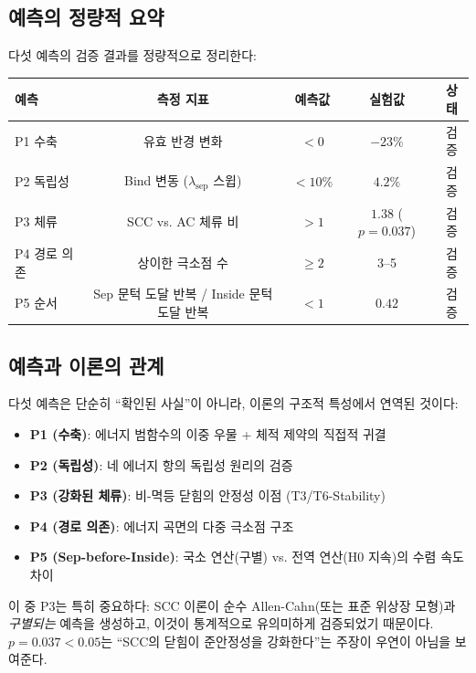 \subsection{예측의 정량적 요약}

다섯 예측의 검증 결과를 정량적으로 정리한다:

\begin{center}
\begin{tabular}{lcccc}
\hline
\textbf{예측} & \textbf{측정 지표} & \textbf{예측값} & \textbf{실험값} & \textbf{상태} \\
\hline
P1 수축 & 유효 반경 변화 & $< 0$ & $-23\%$ & 검증 \\
P2 독립성 & Bind 변동 ($\lambda_{\mathrm{sep}}$ 스윕) & $< 10\%$ & $4.2\%$ & 검증 \\
P3 체류 & SCC vs. AC 체류 비 & $> 1$ & $1.38$ ($p=0.037$) & 검증 \\
P4 경로 의존 & 상이한 극소점 수 & $\geq 2$ & 3--5 & 검증 \\
P5 순서 & Sep 문턱 도달 반복 / Inside 문턱 도달 반복 & $< 1$ & $0.42$ & 검증 \\
\hline
\end{tabular}
\end{center}

\subsection{예측과 이론의 관계}

다섯 예측은 단순히 ``확인된 사실''이 아니라, 이론의 구조적 특성에서 연역된 것이다:

\begin{itemize}
    \item \textbf{P1 (수축)}: 에너지 범함수의 이중 우물 + 체적 제약의 직접적 귀결
    \item \textbf{P2 (독립성)}: 네 에너지 항의 독립성 원리의 검증
    \item \textbf{P3 (강화된 체류)}: 비-멱등 닫힘의 안정성 이점 (T3/T6-Stability)
    \item \textbf{P4 (경로 의존)}: 에너지 곡면의 다중 극소점 구조
    \item \textbf{P5 (Sep-before-Inside)}: 국소 연산(구별) vs. 전역 연산(H0 지속)의 수렴 속도 차이
\end{itemize}

이 중 P3는 특히 중요하다: SCC 이론이 순수 Allen-Cahn(또는 표준 위상장 모형)과 \emph{구별되는} 예측을 생성하고, 이것이 통계적으로 유의미하게 검증되었기 때문이다. $p = 0.037 < 0.05$는 ``SCC의 닫힘이 준안정성을 강화한다''는 주장이 우연이 아님을 보여준다.

